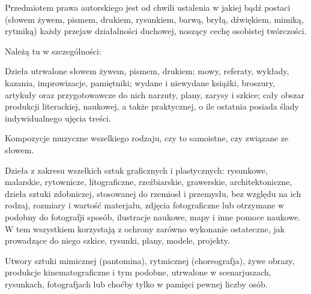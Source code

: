 \documentclass[withmarginpar]{book}
\begin{document}
\begin{description}
Przedmiotem prawa autorskiego jest od chwili ustalenia w jakiej bądź
postaci (słowem żywem, pismem, drukiem, rysunkiem, barwą, bryłą,
dźwiękiem, mimiką, rytmiką) każdy przejaw działalności duchowej,
noszący cechę osobistej twórczości.

Należą tu w szczególności: 

Dzieła utrwalone słowem żywem, pismem,
drukiem; mowy, referaty, wykłady, kazania, improwizacje, pamiętniki;
wydane i niewydane książki, broszury, artykuły oraz przygotowawcze do
nich narzuty, plany, zarysy i szkice; cały obszar produkcji
literackiej, naukowej, a także praktycznej, o ile ostatnia posiada
ślady indywidualnego ujęcia treści.

Kompozycje muzyczne wszelkiego rodzaju, czy to samoistne, czy związane ze słowem.

Dzieła z zakresu wszelkich sztuk graficznych i plastycznych:
rysunkowe, malarskie, rytownicze, litograficzne, rzeźbiarskie,
grawerskie, architektoniczne, dzieła sztuki zdobniczej, stosowanej do
rzemiosł i przemysłu, bez względu na ich rodzaj, rozmiary i wartość
materjału, zdjęcia fotograficzne lub otrzymane w podobny do fotografji
sposób, ilustracje naukowe, mapy i inne pomoce naukowe. W tem
wszystkiem korzystają z ochrony zarówno wykonanie ostateczne, jak
prowadzące do niego szkice, rysunki, plany, modele, projekty.

Utwory sztuki mimicznej (pantomina), rytmicznej (choreografja), żywe
obrazy, produkcje kinematograficzne i tym podobne, utrwalone w
scenarjuszach, rysunkach, fotografjach lub choćby tylko w pamięci
pewnej liczby osób.

\end{description}
\end{document}
